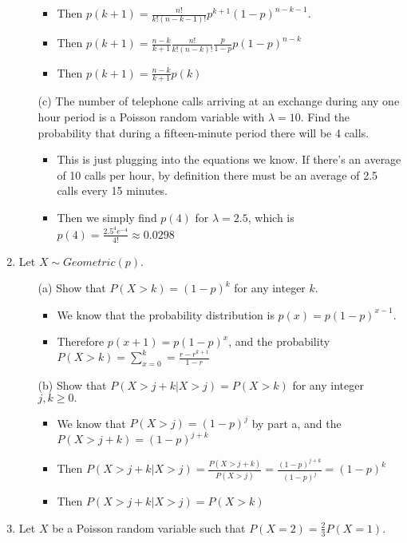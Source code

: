 \documentclass{article}
\begin{document}
\begin{enumerate}
\begin{itemize}
\begin{itemize}
        \item Then $p(k+1) = \frac{n!}{k!(n-k-1)!} p^{k+1} (1 - p)^{n-k-1}$.
        \item Then $p(k+1) = \frac{n-k}{k+1} \frac{n!}{k!(n-k)!} \frac{p}{1-p} p(1-p)^{n-k}$
        \item Then $p(k+1) = \frac{n-k}{k+1} p(k)$
        \end{itemize}
    \item [(c)] The number of telephone calls arriving at an exchange during any one hour period is a Poisson random variable with $\lambda=10$. Find the probability that during a fifteen-minute period there will be 4 calls.
        \begin{itemize}
        \item This is just plugging into the equations we know. If there's an average of 10 calls per hour, by definition there must be an average of 2.5 calls every 15 minutes.
        \item Then we simply find $p(4)$ for $\lambda = 2.5$, which is $p(4) = \frac{2.5^4 e^{-4}}{4!} \approx 0.0298 $
        \end{itemize}
    \end{itemize}
\item Let $X \sim Geometric(p)$.
    \begin{enumerate}
    \item [(a)] Show that $P(X>k)=(1-p)^k$ for any integer $k$.
        \begin{itemize}
        \item We know that the probability distribution is $p(x) = p(1 - p)^{x-1}$.
        \item Therefore $p(x + 1) = p(1 - p)^x$, and the probability $P(X > k) = \sum_{x=0}^k = \frac{r - r^{k+1}}{1-r}$
        \end{itemize}
    \item [(b)] Show that  $P(X> j+k|X > j)=P(X > k)$ for any integer $j,k\ge 0.$
        \begin{itemize}
        \item We know that $P(X > j) = (1 - p)^j$ by part a, and the $P(X > j + k) = (1 - p)^{j + k}$
        \item Then $P(X > j + k | X > j) = \frac{P(X > j + k)}{P(X > j)} = \frac{(1 - p)^{j + k}}{(1 - p)^{j}} = (1 - p)^k$
        \item Then $P(X > j + k | X > j) = P(X > k)$
        \end{itemize}
    \end{enumerate}
\item Let $X$ be a Poisson random variable such that $P(X=2)=\frac{2}{3}P(X=1)$.

\end{enumerate}
\end{document}
